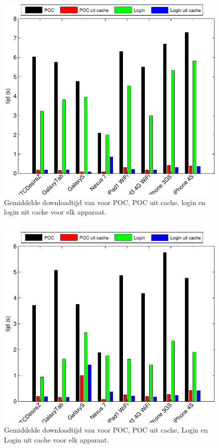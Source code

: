 \begin{figure}[H]
  \centering
  \includegraphics[width=\textwidth]{figuren/performance-jquery.pdf}
  \caption{Gemiddelde downloadtijd van \jqm{} voor POC,  POC uit cache, login en login uit cache voor elk apparaat.}
  \label{fig:performantie-jqm}
\end{figure}

\subsection{\lungo}

\begin{figure}[H]
  \centering
  \includegraphics[width=\textwidth]{figuren/performance-lungo.pdf}
  \caption{Gemiddelde downloadtijd van \lungo{} voor POC,  POC uit cache,  Login en Login uit cache voor elk apparaat.}
  \label{fig:performantie-lungo}
\end{figure}
